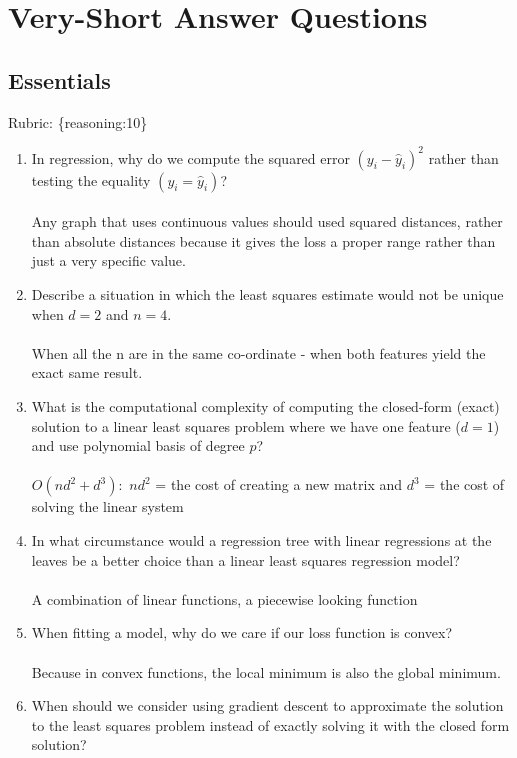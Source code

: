 \documentclass{article}
\def\rubric#1{\gre{Rubric: \{#1\}}}{}
\def\gre#1{{\color{gre}#1}}
\def\enum#1{\begin{enumerate}#1\end{enumerate}}
\begin{document}
\section{Very-Short Answer Questions}

\subsection{Essentials}
\rubric{reasoning:10}

\enum{
\item In regression, why do we compute the squared error $(y_i - \hat{y}_i)^2$ rather than testing the equality $(y_i = \hat{y}_i)$? \\\\
Any graph that uses continuous values should used squared distances, rather than absolute distances because it gives the loss a proper range rather than just a very specific value.
\item Describe a situation in which the least squares estimate would not be unique when $d=2$ and $n=4$. \\\\
When all the n are in the same co-ordinate - when both features yield the exact same result.
\item What is the computational complexity of computing the closed-form (exact) solution to a linear least squares problem where we have one feature ($d = 1$) and use polynomial basis of degree $p$? \\\\
$O(nd^2 + d^3):$
$nd^2$ = the cost of creating a new matrix and $d^3$ = the cost of solving the linear system
\item In what circumstance would a regression tree with linear regressions at the leaves be a better choice
than a linear least squares regression model? \\\\
A combination of linear functions, a piecewise looking function
\item When fitting a model, why do we care if our loss function is convex?\\\\
Because in convex functions, the local minimum is also the global minimum.
\item When should we consider using gradient descent to approximate the solution to the least squares problem instead of exactly solving it with the closed form solution?\\\\
}
\end{document}
